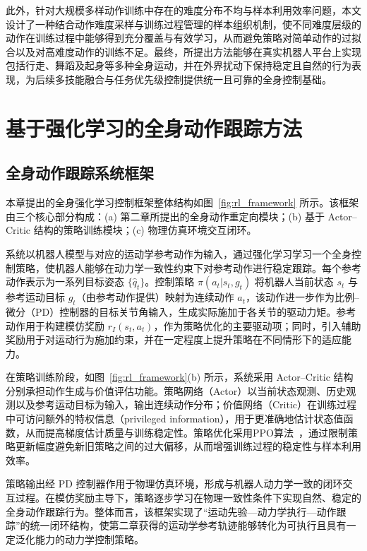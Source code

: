 此外，针对大规模多样动作训练中存在的难度分布不均与样本利用效率问题，本文设计了一种结合动作难度采样与训练过程管理的样本组织机制，使不同难度层级的动作在训练过程中能够得到充分覆盖与有效学习，从而避免策略对简单动作的过拟合以及对高难度动作的训练不足。最终，所提出方法能够在真实机器人平台上实现包括行走、舞蹈及起身等多种全身运动，并在外界扰动下保持稳定且自然的行为表现，为后续多技能融合与任务优先级控制提供统一且可靠的全身控制基础。

\section{基于强化学习的全身动作跟踪方法}

\subsection{全身动作跟踪系统框架}

本章提出的全身强化学习控制框架整体结构如图~\ref{fig:rl_framework} 所示。该框架由三个核心部分构成：(a) 第二章所提出的全身动作重定向模块；(b) 基于 Actor–Critic 结构的策略训练模块；(c) 物理仿真环境交互闭环。

系统以机器人模型与对应的运动学参考动作为输入，通过强化学习学习一个全身控制策略，使机器人能够在动力学一致性约束下对参考动作进行稳定跟踪。每个参考动作表示为一系列目标姿态 $\{\hat{q}_t\}$。控制策略 $\pi(a_t|s_t, g_t)$ 将机器人当前状态 $s_t$ 与参考运动目标 $g_t$（由参考动作提供）映射为连续动作 $a_t$，该动作进一步作为比例–微分（PD）控制器的目标关节角输入，生成实际施加于各关节的驱动力矩。参考动作用于构建模仿奖励 $r_I(s_t,a_t)$，作为策略优化的主要驱动项；同时，引入辅助奖励用于对运动行为施加约束，并在一定程度上提升策略在不同情形下的适应能力。

在策略训练阶段，如图~\ref{fig:rl_framework}(b) 所示，系统采用 Actor–Critic 结构分别承担动作生成与价值评估功能。策略网络（Actor）以当前状态观测、历史观测以及参考运动目标为输入，输出连续动作分布；价值网络（Critic）在训练过程中可访问额外的特权信息（privileged information），用于更准确地估计状态值函数，从而提高梯度估计质量与训练稳定性。策略优化采用PPO算法~\cite{schulman2017proximal}，通过限制策略更新幅度避免新旧策略之间的过大偏移，从而增强训练过程的稳定性与样本利用效率。

策略输出经 PD 控制器作用于物理仿真环境，形成与机器人动力学一致的闭环交互过程。在模仿奖励主导下，策略逐步学习在物理一致性条件下实现自然、稳定的全身动作跟踪行为。整体而言，该框架实现了“运动先验—动力学执行—动作跟踪”的统一闭环结构，使第二章获得的运动学参考轨迹能够转化为可执行且具有一定泛化能力的动力学控制策略。


